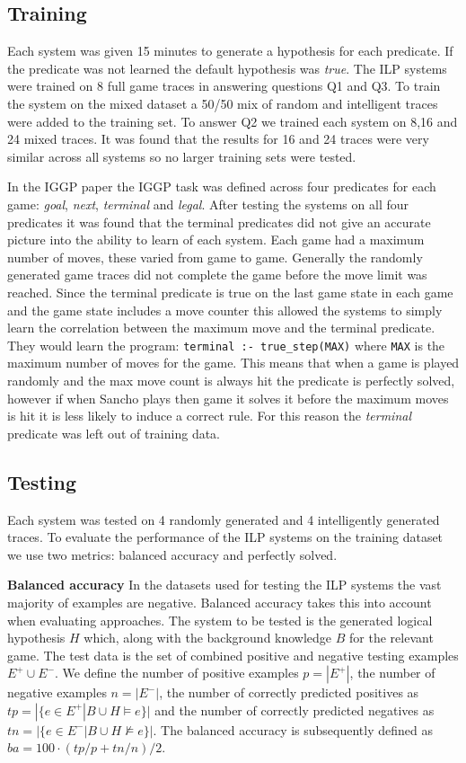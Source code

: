 \subsection{Training}

Each system was given 15 minutes to generate a hypothesis for each predicate. If the predicate was not learned the default hypothesis was \textit{true}. The ILP systems were trained on 8 full game traces in answering questions Q1 and Q3. To train the system on the mixed dataset a 50/50 mix of random and intelligent traces were added to the training set. To answer Q2 we trained each system on 8,16 and 24 mixed traces. It was found that the results for 16 and 24 traces were very similar across all systems so no larger training sets were tested.

In the IGGP paper\cite{Cropper/IGGP} the IGGP task was defined across four predicates for each game: \textit{goal}, \textit{next}, \textit{terminal} and \textit{legal}. After testing the systems on all four predicates it was found that the terminal predicates did not give an accurate picture into the ability to learn of each system. Each game had a maximum number of moves, these varied from game to game. Generally the randomly generated game traces did not complete the game before the move limit was reached. Since the terminal predicate is true on the last game state in each game and the game state includes a move counter this allowed the systems to simply learn the correlation between the maximum move and the terminal predicate. They would learn the program: \verb|terminal :- true_step(MAX)| where \verb|MAX| is the maximum number of moves for the game. This means that when a game is played randomly and the max move count is always hit the predicate is perfectly solved, however if when Sancho plays then game it solves it before the maximum moves is hit it is less likely to induce a correct rule. For this reason the \textit{terminal} predicate was left out of training data.

\subsection{Testing}

Each system was tested on 4 randomly generated and 4 intelligently generated traces. To evaluate the performance of the ILP systems on the training dataset we use two metrics: balanced accuracy and perfectly solved.

\textbf{Balanced accuracy} In the datasets used for testing the ILP systems the vast majority of examples are negative. Balanced accuracy takes this into account when evaluating approaches. The system to be tested is the generated logical hypothesis $H$ which, along with the background knowledge $B$ for the relevant game. The test data is the set of combined positive and negative testing examples $E^+ \cup E^-$. We define the number of positive examples $p = |E^+|$, the number of negative examples $n = |E^-|$, the number of correctly predicted positives as $tp = |\{e\in E^+|B\cup H \models e\}|$ and the number of correctly predicted negatives as $tn = |\{e\in E^-|B\cup H \not\models e\}|$. The balanced accuracy is subsequently defined as $ba = 100 \cdot (tp/p + tn/n)/2$.


